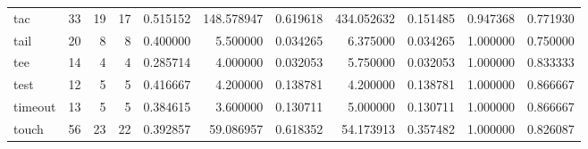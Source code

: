 \begin{tabular}{lrrrrrrrrrr}
tac       &                                      33 &                 19 &                                17 &                                   0.515152 &                             148.578947 &                                     0.619618 &                        434.052632 &                                0.151485 &                           0.947368 &                                           0.771930 \\
tail      &                                      20 &                  8 &                                 8 &                                   0.400000 &                               5.500000 &                                     0.034265 &                          6.375000 &                                0.034265 &                           1.000000 &                                           0.750000 \\
tee       &                                      14 &                  4 &                                 4 &                                   0.285714 &                               4.000000 &                                     0.032053 &                          5.750000 &                                0.032053 &                           1.000000 &                                           0.833333 \\
test      &                                      12 &                  5 &                                 5 &                                   0.416667 &                               4.200000 &                                     0.138781 &                          4.200000 &                                0.138781 &                           1.000000 &                                           0.866667 \\
timeout   &                                      13 &                  5 &                                 5 &                                   0.384615 &                               3.600000 &                                     0.130711 &                          5.000000 &                                0.130711 &                           1.000000 &                                           0.866667 \\
touch     &                                      56 &                 23 &                                22 &                                   0.392857 &                              59.086957 &                                     0.618352 &                         54.173913 &                                0.357482 &                           1.000000 &                                           0.826087 \\

\end{tabular}
